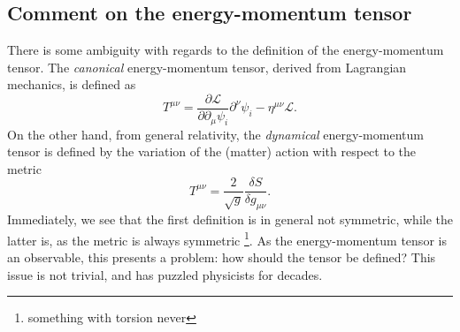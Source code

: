 \subsection{Comment on the energy-momentum tensor}
There is some ambiguity with regards to the definition of the energy-momentum tensor\cites{kachelriessQuantumFieldsHubble2018}{chernodubThermalTransportGeometry2021}{vanderwurffMagnetovorticalThermoelectricTransport2019}{forgerCurrentsEnergyMomentumTensor2004}.
The \emph{canonical} energy-momentum tensor, derived from Lagrangian mechanics, is defined as
\begin{equation}
	T^{\mu \nu } = \frac{\partial \mathcal{L}}{\partial \partial _{\mu } \psi_i } \partial ^{\nu } \psi_i - \eta^{\mu \nu } \mathcal{L}.
\end{equation}
On the other hand, from general relativity, the \emph{dynamical} energy-momentum tensor is defined by the variation of the (matter) action with respect to the metric\cite{kachelriessQuantumFieldsHubble2018}
\begin{equation}
	T^{\mu \nu} = \frac{2}{\sqrt{g} } \frac{\delta S}{\delta g_{\mu \nu}}.
\end{equation}
Immediately, we see that the first definition is in general not symmetric, while the latter is, as the metric is always symmetric \footnote{something with torsion never}.
As the energy-momentum tensor is an observable, this presents a problem:
how should the tensor be defined?
This issue is not trivial, and has puzzled physicists for decades\cite{forgerCurrentsEnergyMomentumTensor2004}.

